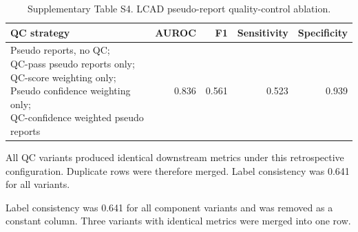 \begin{table}[t]
  \centering
  \caption{Supplementary Table S4. LCAD pseudo-report quality-control ablation.}
  \label{tab:s4_lcad_qc_ablation}
  \small
  \begin{threeparttable}
  \begin{tabular}{lrrrr}
    \toprule
    \textbf{QC strategy} & \textbf{AUROC} & \textbf{F1} & \textbf{Sensitivity} & \textbf{Specificity} \\
    \midrule
    \makecell[l]{Pseudo reports, no QC;\\QC-pass pseudo reports only;\\QC-score weighting only;\\Pseudo confidence weighting only;\\QC-confidence weighted pseudo reports} & 0.836 & 0.561 & 0.523 & 0.939 \\
    \bottomrule
  \end{tabular}
  \begin{tablenotes}[flushleft]
    \footnotesize
    \item All QC variants produced identical downstream metrics under this retrospective configuration. Duplicate rows were therefore merged. Label consistency was 0.641 for all variants.
  \end{tablenotes}
  \end{threeparttable}
\end{table}


\begin{table}[t]
  \centering
  \caption{Supplementary Table S5. RASA component ablation.}
  \label{tab:s5_rasa_component_ablation}
  \small
  \begin{threeparttable}
  \begin{tablenotes}[flushleft]
    \footnotesize
    \item Label consistency was 0.641 for all component variants and was removed as a constant column. Three variants with identical metrics were merged into one row.
  \end{tablenotes}
  \end{threeparttable}
\end{table}


